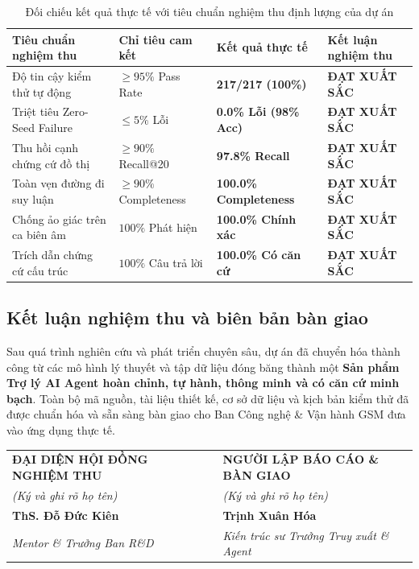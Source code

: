 \documentclass[a4paper,11pt]{article}
\begin{document}
\begin{table}[htbp]
\centering
\footnotesize
\caption{Đối chiếu kết quả thực tế với tiêu chuẩn nghiệm thu định lượng của dự án}
\label{tab:dod-acceptance}
\vspace{0.15cm}
\begin{tabularx}{\textwidth}{>{\raggedright\arraybackslash}p{4.2cm}>{\centering\arraybackslash}p{2.8cm}>{\centering\arraybackslash}p{2.8cm}>{\centering\arraybackslash}X}
\toprule
\textbf{Tiêu chuẩn nghiệm thu} & \textbf{Chỉ tiêu cam kết} & \textbf{Kết quả thực tế} & \textbf{Kết luận nghiệm thu} \\
\midrule
Độ tin cậy kiểm thử tự động & $\ge 95\%$ Pass Rate & \textbf{217/217 (100\%)} & \textcolor{passgreen}{\textbf{ĐẠT XUẤT SẮC}} \\
Triệt tiêu Zero-Seed Failure & $\le 5\%$ Lỗi & \textbf{0.0\% Lỗi (98\% Acc)} & \textcolor{passgreen}{\textbf{ĐẠT XUẤT SẮC}} \\
Thu hồi cạnh chứng cứ đồ thị & $\ge 90\%$ Recall@20 & \textbf{97.8\% Recall} & \textcolor{passgreen}{\textbf{ĐẠT XUẤT SẮC}} \\
Toàn vẹn đường đi suy luận & $\ge 90\%$ Completeness & \textbf{100.0\% Completeness} & \textcolor{passgreen}{\textbf{ĐẠT XUẤT SẮC}} \\
Chống ảo giác trên ca biên âm & $100\%$ Phát hiện & \textbf{100.0\% Chính xác} & \textcolor{passgreen}{\textbf{ĐẠT XUẤT SẮC}} \\
Trích dẫn chứng cứ cấu trúc & $100\%$ Câu trả lời & \textbf{100.0\% Có căn cứ} & \textcolor{passgreen}{\textbf{ĐẠT XUẤT SẮC}} \\
\bottomrule
\end{tabularx}
\end{table}

\subsection{Kết luận nghiệm thu và biên bản bàn giao}
Sau quá trình nghiên cứu và phát triển chuyên sâu, dự án đã chuyển hóa thành công từ các mô hình lý thuyết và tập dữ liệu đóng băng thành một \textbf{Sản phẩm Trợ lý AI Agent hoàn chỉnh, tự hành, thông minh và có căn cứ minh bạch}. Toàn bộ mã nguồn, tài liệu thiết kế, cơ sở dữ liệu và kịch bản kiểm thử đã được chuẩn hóa và sẵn sàng bàn giao cho Ban Công nghệ \& Vận hành GSM đưa vào ứng dụng thực tế.

\vspace{1.0cm}
\begin{center}
\begin{tabularx}{\textwidth}{X c X}
    \textbf{ĐẠI DIỆN HỘI ĐỒNG NGHIỆM THU} & \hspace{1cm} & \textbf{NGƯỜI LẬP BÁO CÁO \& BÀN GIAO} \\[0.2cm]
    \textit{(Ký và ghi rõ họ tên)} & & \textit{(Ký và ghi rõ họ tên)} \\[2.2cm]
    \textbf{ThS. Đỗ Đức Kiên} & & \textbf{\textcolor{brandblue}{Trịnh Xuân Hóa}} \\
    \textit{Mentor \& Trưởng Ban R\&D} & & \textit{Kiến trúc sư Trưởng Truy xuất \& Agent}
\end{tabularx}
\end{center}
\end{document}
